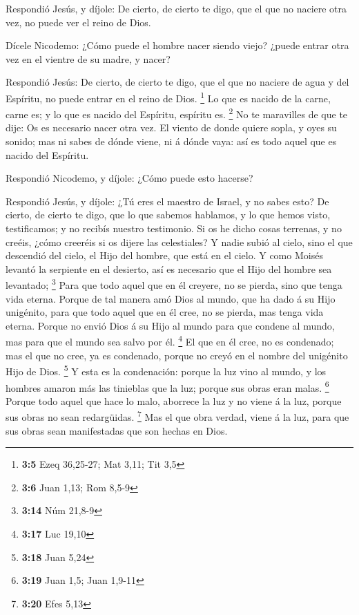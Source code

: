  Respondió Jesús, y díjole: De cierto, de cierto te digo,
que el que no naciere otra vez, no puede ver el reino de Dios.

 Dícele Nicodemo: ¿Cómo puede el hombre nacer siendo
viejo? ¿puede entrar otra vez en el vientre de su madre, y nacer?

 Respondió Jesús: De cierto, de cierto te digo, que el que
no naciere de agua y del Espíritu, no puede entrar en el reino de Dios.
\footnote{\textbf{3:5} Ezeq 36,25-27; Mat 3,11; Tit 3,5} 
Lo que es nacido de la carne, carne es; y lo que es nacido del Espíritu,
espíritu es. \footnote{\textbf{3:6} Juan 1,13; Rom 8,5-9} 
No te maravilles de que te dije: Os es necesario nacer otra vez.
 El viento de donde quiere sopla, y oyes su sonido; mas ni
sabes de dónde viene, ni á dónde vaya: así es todo aquel que es nacido
del Espíritu.

 Respondió Nicodemo, y díjole: ¿Cómo puede esto hacerse?

 Respondió Jesús, y díjole: ¿Tú eres el maestro de
Israel, y no sabes esto?  De cierto, de cierto te digo,
que lo que sabemos hablamos, y lo que hemos visto, testificamos; y no
recibís nuestro testimonio.  Si os he dicho cosas
terrenas, y no creéis, ¿cómo creeréis si os dijere las celestiales?
 Y nadie subió al cielo, sino el que descendió del cielo,
el Hijo del hombre, que está en el cielo.  Y como Moisés
levantó la serpiente en el desierto, así es necesario que el Hijo del
hombre sea levantado; \footnote{\textbf{3:14} Núm 21,8-9}
 Para que todo aquel que en él creyere, no se pierda,
sino que tenga vida eterna.  Porque de tal manera amó
Dios al mundo, que ha dado á su Hijo unigénito, para que todo aquel que
en él cree, no se pierda, mas tenga vida eterna.  Porque
no envió Dios á su Hijo al mundo para que condene al mundo, mas para que
el mundo sea salvo por él. \footnote{\textbf{3:17} Luc 19,10}
 El que en él cree, no es condenado; mas el que no cree,
ya es condenado, porque no creyó en el nombre del unigénito Hijo de
Dios. \footnote{\textbf{3:18} Juan 5,24}  Y esta es la
condenación: porque la luz vino al mundo, y los hombres amaron más las
tinieblas que la luz; porque sus obras eran malas. \footnote{\textbf{3:19}
  Juan 1,5; Juan 1,9-11}  Porque todo aquel que hace lo
malo, aborrece la luz y no viene á la luz, porque sus obras no sean
redargüidas. \footnote{\textbf{3:20} Efes 5,13}  Mas el
que obra verdad, viene á la luz, para que sus obras sean manifestadas
que son hechas en Dios.

